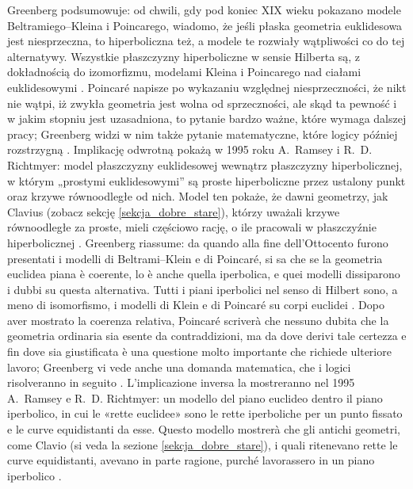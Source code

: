 Greenberg \cite[s. 213]{greenberg_2010} podsumowuje: od chwili, gdy pod koniec XIX wieku pokazano modele Beltramiego--Kleina i Poincarego, wiadomo, że jeśli płaska geometria euklidesowa jest niesprzeczna, to hiperboliczna też, a modele te rozwiały wątpliwości co do tej alternatywy. %
Wszystkie płaszczyzny hiperboliczne w sensie Hilberta są, z dokładnością do izomorfizmu, modelami Kleina i Poincarego nad ciałami euklidesowymi \cite[s. 209]{greenberg_2010}. %
Poincaré napisze po wykazaniu względnej niesprzeczności, że nikt nie wątpi, iż zwykła geometria jest wolna od sprzeczności, ale skąd ta pewność i w jakim stopniu jest uzasadniona, to pytanie bardzo ważne, które wymaga dalszej pracy; Greenberg widzi w nim także pytanie matematyczne, które logicy później rozstrzygną \cite[s. 214]{greenberg_2010}. %
Implikację odwrotną pokażą w 1995 roku A.~Ramsey i R.~D. Richtmyer: model płaszczyzny euklidesowej wewnątrz płaszczyzny hiperbolicznej, w którym „prostymi euklidesowymi'' są proste hiperboliczne przez ustalony punkt oraz krzywe równoodległe od nich. %
Model ten pokaże, że dawni geometrzy, jak Clavius (zobacz sekcję \ref{sekcja_dobre_stare}), którzy uważali krzywe równoodległe za proste, mieli częściowo rację, o ile pracowali w płaszczyźnie hiperbolicznej \cite[s. 214]{greenberg_2010}. %
Greenberg \cite[p. 213]{greenberg_2010} riassume: da quando alla fine dell'Ottocento furono presentati i modelli di Beltrami--Klein e di Poincaré, si sa che se la geometria euclidea piana è coerente, lo è anche quella iperbolica, e quei modelli dissiparono i dubbi su questa alternativa. %
Tutti i piani iperbolici nel senso di Hilbert sono, a meno di isomorfismo, i modelli di Klein e di Poincaré su corpi euclidei \cite[p. 209]{greenberg_2010}. %
Dopo aver mostrato la coerenza relativa, Poincaré scriverà che nessuno dubita che la geometria ordinaria sia esente da contraddizioni, ma da dove derivi tale certezza e fin dove sia giustificata è una questione molto importante che richiede ulteriore lavoro; Greenberg vi vede anche una domanda matematica, che i logici risolveranno in seguito \cite[p. 214]{greenberg_2010}. %
L'implicazione inversa la mostreranno nel 1995 A.~Ramsey e R.~D. Richtmyer: un modello del piano euclideo dentro il piano iperbolico, in cui le «rette euclidee» sono le rette iperboliche per un punto fissato e le curve equidistanti da esse. %
Questo modello mostrerà che gli antichi geometri, come Clavio (si veda la sezione \ref{sekcja_dobre_stare}), i quali ritenevano rette le curve equidistanti, avevano in parte ragione, purché lavorassero in un piano iperbolico \cite[p. 214]{greenberg_2010}. %
%
%

